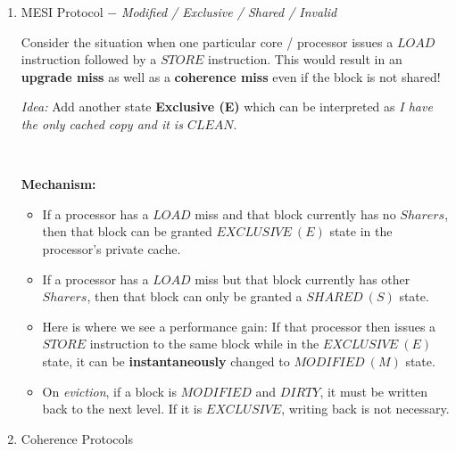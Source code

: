 \documentclass[12pt]{article}
\newenvironment{QandA}{\begin{enumerate}[label=\bfseries\arabic*.]\bfseries}
                      {\end{enumerate}}
\newenvironment{answered}{\par\quad\normalfont}{}
\begin{document}
\begin{QandA}
\item MESI Protocol $-$ \textit{Modified / Exclusive / Shared / Invalid}
\begin{answered}

Consider the situation when one particular core / processor issues a $LOAD$ instruction followed by a $STORE$ instruction. This would result in an \textbf{upgrade  miss} as well as a \textbf{coherence miss} even if the block is not shared!

\textit{Idea:} Add another state \textbf{Exclusive (E)} which can be interpreted as \textit{I have the only cached copy and it is $CLEAN$}.

\

\textbf{Mechanism:}
\begin{itemize}
    \item If a processor has a $LOAD$ miss and that block currently has no $Sharers$, then that block can be granted $EXCLUSIVE\ (E)$ state in the processor's private cache.
    \item If a processor has a $LOAD$ miss but that block currently has other $Sharers$, then that block can only be granted a $SHARED\ (S)$ state.
    \item Here is where we see a performance gain: If that processor then issues a $STORE$ instruction to the same block while in the $EXCLUSIVE\ (E)$ state, it can be \textbf{instantaneously} changed to $MODIFIED\ (M)$ state. 
    \item On \textit{eviction}, if a block is $MODIFIED$ and $DIRTY$, it must be written back to the next level. If it is $EXCLUSIVE$, writing back is not necessary.
\end{itemize}
\end{answered}

\newpage 

\item Coherence Protocols

\begin{answered}


\end{answered}
\end{QandA}
\end{document}
